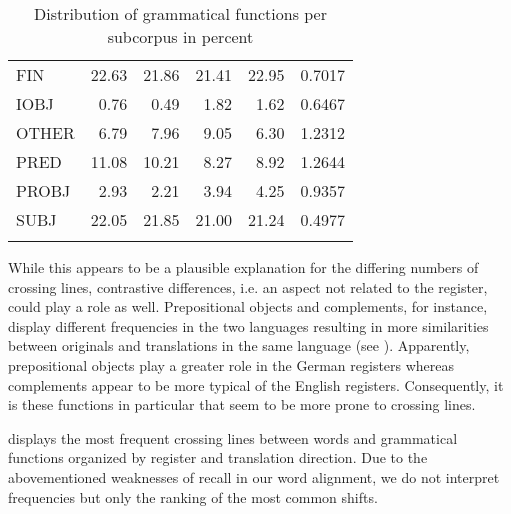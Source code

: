 \documentclass[output=paper]{LSP/langsci}
\begin{document}
\begin{table}
\begin{tabular}{lrrrrr}
FIN & 22.63 & 21.86 & 21.41 & 22.95 & 0.7017\\
IOBJ & 0.76 & 0.49 & 1.82 & 1.62 & 0.6467\\
OTHER & 6.79 & 7.96 & 9.05 & 6.30 & 1.2312\\
PRED & 11.08 & 10.21 & 8.27 & 8.92 & 1.2644\\
PROBJ & 2.93 & 2.21 & 3.94 & 4.25 & 0.9357\\
SUBJ & 22.05 & 21.85 & 21.00 & 21.24 & 0.4977\\
\lspbottomrule
\end{tabular}
\caption{Distribution of grammatical functions per subcorpus in percent}
\label{tab:culo:3}
\end{table}


While this appears to be a plausible explanation for the differing numbers of crossing lines, contrastive differences, i.e. an aspect not related to the register, could play a role as well. Prepositional objects and complements, for instance, display different frequencies in the two languages resulting in more similarities between originals and translations in the same language (see ). Apparently, prepositional objects play a greater role in the German registers whereas complements appear to be more typical of the English registers. Consequently, it is these functions in particular that seem to be more prone to crossing lines.

 displays the most frequent crossing lines between words and grammatical functions organized by register and translation direction. Due to the abovementioned weaknesses of recall in our word alignment, we do not interpret frequencies but only the ranking of the most common shifts. 
\end{document}
